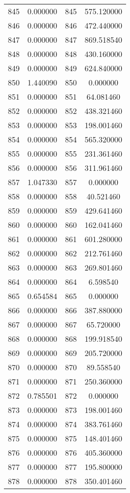 \documentclass[12pt]{article}
\begin{document}
\begin{longtable}{@{}cccc@{}}
845 & 0.000000 & 845 & 575.120000 \\
846 & 0.000000 & 846 & 472.440000 \\
847 & 0.000000 & 847 & 869.518540 \\
848 & 0.000000 & 848 & 430.160000 \\
849 & 0.000000 & 849 & 624.840000 \\
850 & 1.440090 & 850 & 0.000000 \\
851 & 0.000000 & 851 & 64.081460 \\
852 & 0.000000 & 852 & 438.321460 \\
853 & 0.000000 & 853 & 198.001460 \\
854 & 0.000000 & 854 & 565.320000 \\
855 & 0.000000 & 855 & 231.361460 \\
856 & 0.000000 & 856 & 311.961460 \\
857 & 1.047330 & 857 & 0.000000 \\
858 & 0.000000 & 858 & 40.521460 \\
859 & 0.000000 & 859 & 429.641460 \\
860 & 0.000000 & 860 & 162.041460 \\
861 & 0.000000 & 861 & 601.280000 \\
862 & 0.000000 & 862 & 212.761460 \\
863 & 0.000000 & 863 & 269.801460 \\
864 & 0.000000 & 864 & 6.598540 \\
865 & 0.654584 & 865 & 0.000000 \\
866 & 0.000000 & 866 & 387.880000 \\
867 & 0.000000 & 867 & 65.720000 \\
868 & 0.000000 & 868 & 199.918540 \\
869 & 0.000000 & 869 & 205.720000 \\
870 & 0.000000 & 870 & 89.558540 \\
871 & 0.000000 & 871 & 250.360000 \\
872 & 0.785501 & 872 & 0.000000 \\
873 & 0.000000 & 873 & 198.001460 \\
874 & 0.000000 & 874 & 383.761460 \\
875 & 0.000000 & 875 & 148.401460 \\
876 & 0.000000 & 876 & 405.360000 \\
877 & 0.000000 & 877 & 195.800000 \\
878 & 0.000000 & 878 & 350.401460 \\

\end{longtable}
\end{document}
